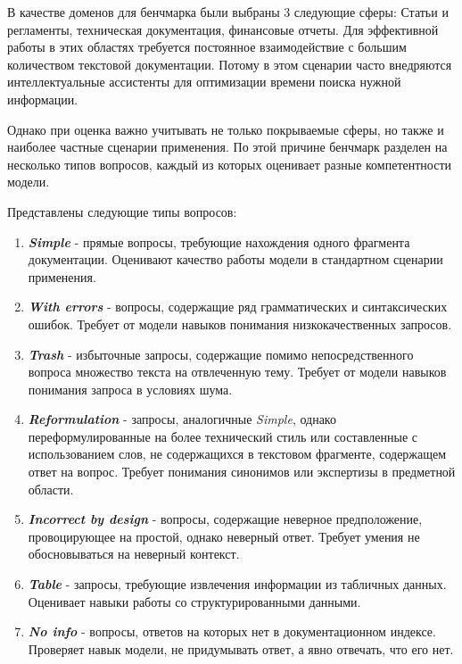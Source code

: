 В качестве доменов для бенчмарка были выбраны 3 следующие сферы: Статьи и регламенты, техническая документация, финансовые отчеты. Для эффективной работы в этих областях требуется постоянное взаимодействие с большим количеством текстовой документации. Потому в этом сценарии часто внедряются интеллектуальные ассистенты для оптимизации времени поиска нужной информации.

Однако при оценка важно учитывать не только покрываемые сферы, но также и наиболее частные сценарии применения. По этой причине бенчмарк разделен на несколько типов вопросов, каждый из которых оценивает разные компетентности модели.

Представлены следующие типы вопросов:

\begin{enumerate}
    \item \textbf{\textit{Simple}} - прямые вопросы, требующие нахождения одного фрагмента документации. Оценивают качество работы модели в стандартном сценарии применения.

    \item \textbf{\textit{With errors}} - вопросы, содержащие ряд грамматических и синтаксических ошибок. Требует от модели навыков понимания низкокачественных запросов.

    \item \textbf{\textit{Trash}} - избыточные запросы, содержащие помимо непосредственного вопроса множество текста на отвлеченную тему. Требует от модели навыков понимания запроса в условиях шума.

    \item \textbf{\textit{Reformulation}} - запросы, аналогичные \textit{Simple}, однако переформулированные на более технический стиль или составленные с использованием слов, не содержащихся в текстовом фрагменте, содержащем ответ на вопрос. Требует понимания синонимов или экспертизы в предметной области.

    \item \textbf{\textit{Incorrect by design}} - вопросы, содержащие неверное предположение, провоцирующее на простой, однако неверный ответ. Требует умения не обосновываться на неверный контекст.

    \item \textbf{\textit{Table}} - запросы, требующие извлечения информации из табличных данных. Оценивает навыки работы со структурированными данными.

    \item \textbf{\textit{No info}} - вопросы, ответов на которых нет в документационном индексе. Проверяет навык модели, не придумывать ответ, а явно отвечать, что его нет.


\end{enumerate}

